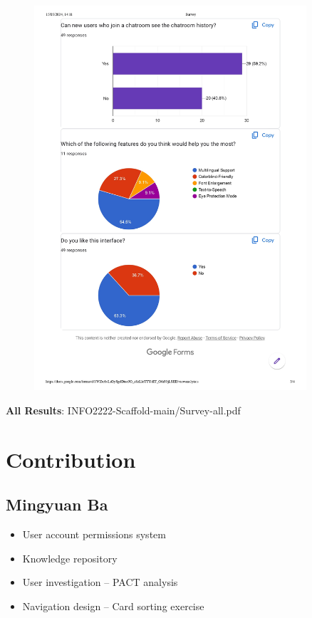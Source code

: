 \documentclass[12pt]{article}
\begin{document}
\begin{figure}[H]
    \centering
    \includegraphics[width=0.9\textwidth]{graphs/Survey-summary_page-0003.jpg}
\end{figure}

\textbf{All Results}: INFO2222-Scaffold-main/Survey-all.pdf

\section{Contribution}

    \subsection*{Mingyuan Ba}
    \begin{itemize}
        \item User account permissions system
        \item Knowledge repository
        \item User investigation – PACT analysis
        \item Navigation design – Card sorting exercise
    \end{itemize}
\end{document}
